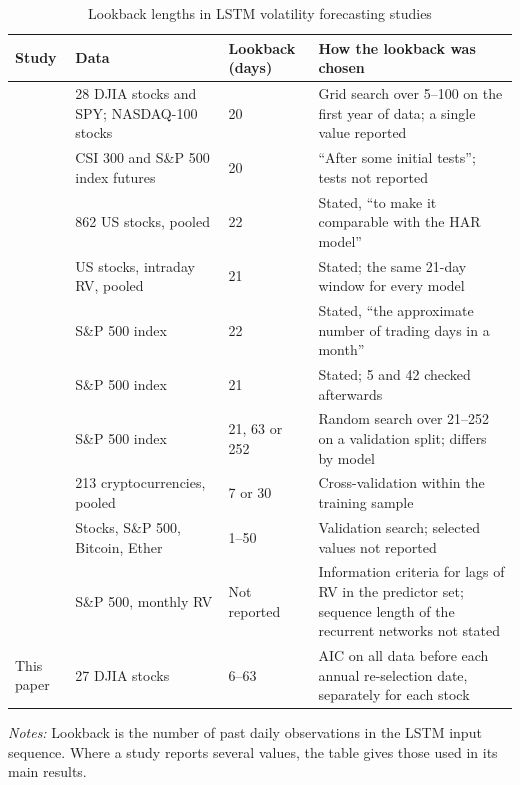 \begin{table}[!htbp]
\centering
\caption{Lookback lengths in LSTM volatility forecasting studies}
\label{tab:lookbacks}
\footnotesize
\setlength{\tabcolsep}{4pt}
\begin{tabular}{@{}p{3.6cm}p{3.9cm}p{2.0cm}p{5.6cm}@{}}
\toprule
Study & Data & Lookback (days) & How the lookback was chosen \\
\midrule
\textcite{petrozziello-2022} & 28 DJIA stocks and SPY; NASDAQ-100 stocks & 20 & Grid search over 5--100 on the first year of data; a single value reported \\
\textcite{chen-2022} & CSI 300 and S\&P 500 index futures & 20 & ``After some initial tests''; tests not reported \\
\textcite{rosenbaum-2022} & 862 US stocks, pooled & 22 & Stated, ``to make it comparable with the HAR model'' \\
\textcite{zhang-2023} & US stocks, intraday RV, pooled & 21 & Stated; the same 21-day window for every model \\
\textcite{roszyk-2024} & S\&P 500 index & 22 & Stated, ``the approximate number of trading days in a month'' \\
\textcite{perekhodko-2025} & S\&P 500 index & 21 & Stated; 5 and 42 checked afterwards \\
\textcite{souto-2023} & S\&P 500 index & 21, 63 or 252 & Random search over 21--252 on a validation split; differs by model \\
\textcite{tang-2024} & 213 cryptocurrencies, pooled & 7 or 30 & Cross-validation within the training sample \\
\textcite{rodikov-2022} & Stocks, S\&P 500, Bitcoin, Ether & 1--50 & Validation search; selected values not reported \\
\textcite{bucci-2020} & S\&P 500, monthly RV & Not reported & Information criteria for lags of RV in the predictor set; sequence length of the recurrent networks not stated \\
\midrule
This paper & 27 DJIA stocks & 6--63 & AIC on all data before each annual re-selection date, separately for each stock \\
\bottomrule
\end{tabular}

\vspace{0.4em}
\begin{minipage}{0.97\textwidth}
\footnotesize
\textit{Notes:} Lookback is the number of past daily observations in the LSTM input sequence. Where a study reports several values, the table gives those used in its main results.
\end{minipage}
\end{table}

